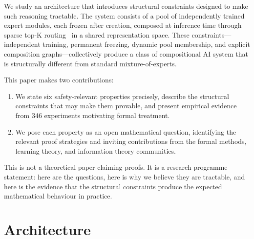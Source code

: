 \documentclass[11pt,a4paper]{article}
\begin{document}
We study an architecture that introduces structural constraints designed to make such reasoning tractable.
The system consists of a pool of independently trained expert modules, each frozen after creation, composed at inference time through sparse top-K routing~\cite{shazeer2017outrageously} in a shared representation space.
These constraints---independent training, permanent freezing, dynamic pool membership, and explicit composition graphs---collectively produce a class of compositional AI system that is structurally different from standard mixture-of-experts.

This paper makes two contributions:
\begin{enumerate}[nosep]
  \item We state six safety-relevant properties precisely, describe the structural constraints that may make them provable, and present empirical evidence from 346 experiments motivating formal treatment.
  \item We pose each property as an open mathematical question, identifying the relevant proof strategies and inviting contributions from the formal methods, learning theory, and information theory communities.
\end{enumerate}

\noindent This is not a theoretical paper claiming proofs.
It is a research programme statement: here are the questions, here is why we believe they are tractable, and here is the evidence that the structural constraints produce the expected mathematical behaviour in practice.

\section{Architecture}
\label{sec:arch}
\end{document}
